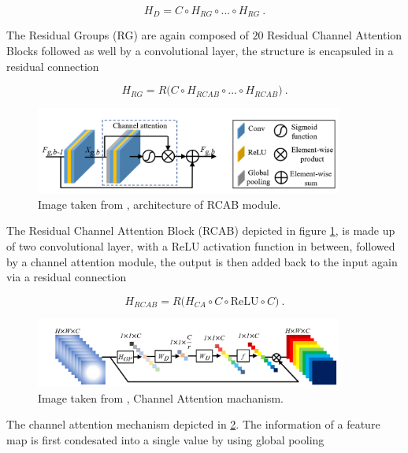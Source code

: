     $$ H_{D} = C \circ H_{RG} \circ ... \circ H_{RG} ~.$$

The Residual Groups (RG) are again composed of $20$ Residual Channel Attention Blocks followed as well by a convolutional layer,
the structure is encapsuled in a residual connection

    $$ H_{RG} = R \big ( C \circ H_{RCAB} \circ ... \circ H_{RCAB} \big) ~.$$

\begin{figure}[h!]
    \includegraphics[width=0.9\textwidth]{models/sisr/imgs/drcan_rcab.png}
    \caption{Image taken from \cite{zhangImageSuperResolutionUsing2018}, architecture of RCAB module.}
    \label{fig:drcan_rcab}
\end{figure}

The Residual Channel Attention Block (RCAB) depicted in figure \ref{fig:drcan_rcab}, 
is made up of two convolutional layer, 
with a ReLU activation function in between, 
followed by a channel attention module,
the output is then added back to the input again via a residual connection

    \begin{equation} \label{eq:rcab}
        H_{RCAB} = R \big( H_{CA} \circ C \circ \text{ReLU} \circ C \big) ~.
    \end{equation}

\begin{figure}[h!]
    \includegraphics[width=0.9\textwidth]{models/sisr/imgs/channel_attention.png}
    \caption{Image taken from \cite{zhangImageSuperResolutionUsing2018}, Channel Attention machanism.}
    \label{fig:channel_attention}
\end{figure}

The channel attention mechanism depicted in \ref{fig:channel_attention}.
The information of a feature map is first condesated into a single value by using global pooling

